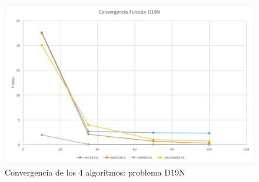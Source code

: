 \begin{figure}[H]
	\centering
	\includegraphics[scale=0.6]{imagenes/ConvergenciaD19N}
	\caption{Convergencia de los 4 algoritmos: problema D19N}
	\label{fig:ConvgD19N}
\end{figure}